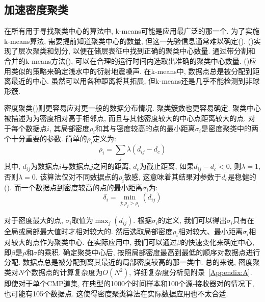 \subsection{加速密度聚类}
在所有用于寻找聚类中心的算法中, k-means可能是应用最广泛的那一个. 为了实施k-means算法, 需要提前知道聚类中心的数量, 但这一先验信息通常难以确定(\cite{Hamerly2004}). (\cite{Wang2012})实现了层次聚类和划分, 以便在储层表征中找到正确的聚类中心数量. 通过带分割和合并的k-means方法(\cite{Muhr2009}), 可以在合理的运行时间内选取出准确的聚类中心数量. (\cite{Lu2014})应用类似的策略来确定浅水中的衍射地震噪声. 在k-means中, 数据点总是被分配到距离最近的中心. 虽然可以用各种距离将其拓展, 但k-means还是几乎不能检测到非球形簇. 

密度聚类(\cite{Rodriguez2014})则更容易应对更一般的数据分布情况. 聚类簇数也更容易确定. 聚类中心被描述为为密度相对高于相邻点, 而且与其他密度较大的中心点距离较大的点. 对于每个数据点$i$, 其局部密度$\rho_i$和其与密度较高的点的最小距离$\sigma_i$是密度聚类中的两个十分重要的参数. 简单的$\rho_i$定义为:
\begin{equation}
    \rho_{i}=\sum_{j} \lambda\left(d_{i j}-d_{c}\right)
\end{equation}
其中, $d_{ij}$为数据点$i$与数据点$j$之间的距离, $d_c$为截止距离, 如果$d_{ij}-d_c<0$, 则$λ = 1$, 否则$λ = 0$. 该算法仅对不同数据点的$\rho_i$敏感, 这意味着其结果对参数于$d_c$是稳健的(\cite{Rodriguez2014}). 而一个数据点到密度较高的点的最小距离$\sigma_i$为: 
\begin{equation}
    \delta_{i}=\min _{j: \rho_{j}>\rho_{i}}\left(d_{i j}\right)
\end{equation}

对于密度最大的点, $\sigma_i$取值为$\max_j(d_{ij})$. 根据$\sigma_i$的定义, 我们可以得出$\sigma_i$只有在全局或局部最大值时才相对较大的. 然后选取局部密度$\rho_i$相对较大、最小距离$\sigma_i$相对较大的点作为聚类中心. 在实际应用中, 我们可以通过$\beta$的快速变化来确定中心, 即$\beta$是$\rho$和$\sigma$的乘积. 确定聚类中心后, 按照局部密度最高到最低的顺序对数据点进行分配. 数据点总是被分配到离其最近的局部密度较高的那一类中. 总的来说, 密度聚类对$N$个数据点的计算复杂度为$O(N^2)$, 详细复杂度分析见附录~\ref{Appendix:A}. 即使对于单个CMP道集, 在典型的1000个时间样本和100个源-接收器对的情况下, 也可能有105个数据点. 这使得密度聚类算法在实际数据应用也不太合适. 











